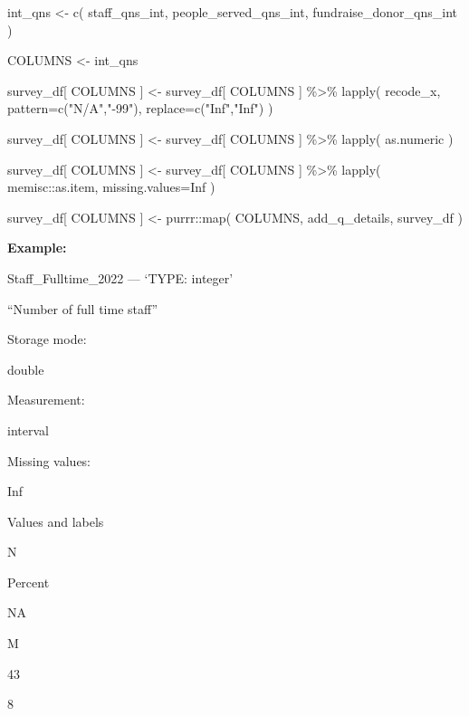 \documentclass[
  letterpaper,
]{scrbook}
\newenvironment{Shaded}{\begin{snugshade}}{\end{snugshade}}
\newcommand{\AttributeTok}[1]{\textcolor[rgb]{0.40,0.45,0.13}{#1}}
\newcommand{\ConstantTok}[1]{\textcolor[rgb]{0.56,0.35,0.01}{#1}}
\newcommand{\FunctionTok}[1]{\textcolor[rgb]{0.28,0.35,0.67}{#1}}
\newcommand{\NormalTok}[1]{\textcolor[rgb]{0.00,0.23,0.31}{#1}}
\newcommand{\OtherTok}[1]{\textcolor[rgb]{0.00,0.23,0.31}{#1}}
\newcommand{\SpecialCharTok}[1]{\textcolor[rgb]{0.37,0.37,0.37}{#1}}
\newcommand{\StringTok}[1]{\textcolor[rgb]{0.13,0.47,0.30}{#1}}
\begin{document}
\begin{Shaded}
\begin{Highlighting}[]
\NormalTok{int\_qns }\OtherTok{\textless{}{-}} 
  \FunctionTok{c}\NormalTok{( staff\_qns\_int, }
\NormalTok{     people\_served\_qns\_int, }
\NormalTok{     fundraise\_donor\_qns\_int )}

\NormalTok{COLUMNS }\OtherTok{\textless{}{-}}\NormalTok{ int\_qns}

\NormalTok{survey\_df[ COLUMNS ] }\OtherTok{\textless{}{-}} 
\NormalTok{  survey\_df[ COLUMNS ] }\SpecialCharTok{\%\textgreater{}\%}
  \FunctionTok{lapply}\NormalTok{( recode\_x, }\AttributeTok{pattern=}\FunctionTok{c}\NormalTok{(}\StringTok{"N/A"}\NormalTok{,}\StringTok{"{-}99"}\NormalTok{), }\AttributeTok{replace=}\FunctionTok{c}\NormalTok{(}\StringTok{"Inf"}\NormalTok{,}\StringTok{"Inf"}\NormalTok{) )}

\NormalTok{survey\_df[ COLUMNS ] }\OtherTok{\textless{}{-}} 
\NormalTok{  survey\_df[ COLUMNS ] }\SpecialCharTok{\%\textgreater{}\%}
  \FunctionTok{lapply}\NormalTok{( as.numeric )}

\NormalTok{survey\_df[ COLUMNS ] }\OtherTok{\textless{}{-}} 
\NormalTok{  survey\_df[ COLUMNS ] }\SpecialCharTok{\%\textgreater{}\%}
  \FunctionTok{lapply}\NormalTok{( memisc}\SpecialCharTok{::}\NormalTok{as.item, }\AttributeTok{missing.values=}\ConstantTok{Inf}\NormalTok{ )}

\NormalTok{survey\_df[ COLUMNS ] }\OtherTok{\textless{}{-}}\NormalTok{ purrr}\SpecialCharTok{::}\FunctionTok{map}\NormalTok{( COLUMNS, add\_q\_details, survey\_df )}
\end{Highlighting}
\end{Shaded}

\textbf{Example:}

Staff\_Fulltime\_2022 --- {`TYPE: integer'}

``Number of full time staff''

Storage mode:

double

Measurement:

interval

Missing values:

Inf

Values and labels

N

Percent

NA

M

43

8
\end{document}
